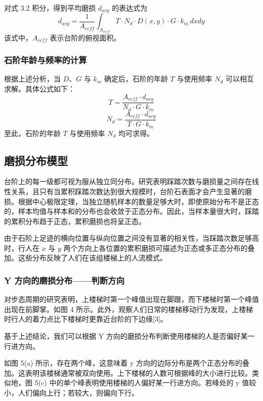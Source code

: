 \documentclass[11pt,a4paper]{ctexart}
\begin{document}
对式 3.2 积分，得到平均磨损 \(d_{avg}\) 的表达式为
\begin{equation}
d_{avg}=\frac{1}{A_{ceff}}\int_{A_{ceff}}T\cdot N_d\cdot D(x,y)\cdot G\cdot k_m\,dxdy \tag{3.8}
\end{equation}
该式中，\(A_{ceff}\) 表示台阶的俯视面积。

\subsubsection{石阶年龄与频率的计算}

根据上述分析，当 \(D\)、\(G\) 与 \(k_m\) 确定后，石阶的年龄 \(T\) 与使用频率 \(N_d\) 可以相互求解。具体公式如下：
\begin{equation}
T=\frac{A_{ceff}\cdot d_{avg}}{N_d\cdot G\cdot k_m} \tag{3.9}
\end{equation}
\begin{equation}
N_d=\frac{A_{ceff}\cdot d_{avg}}{T\cdot G\cdot k_m} \tag{3.10}
\end{equation}
至此，石阶的年龄 \(T\) 与使用频率 \(N_d\) 均可求得。

\subsection{磨损分布模型}

台阶上的每一级都可视为服从独立同分布。研究表明踩踏次数与磨损量之间存在线性关系，且只有当累积踩踏次数达到很大规模时，台阶石表面才会产生显著的磨损。根据中心极限定理，当独立随机样本的数量足够大时，即使原始分布不是正态的，样本均值与样本和的分布也会收敛于正态分布。因此，当样本量很大时，踩踏的累积分布趋于正态，累积磨损也将呈正态。

由于石阶上足迹的横向位置与纵向位置之间没有显著的相关性，当踩踏次数足够高时，行人在 \(x\) 与 \(y\) 两个方向上各位置的累积磨损可描述为正态或多正态分布的叠加。这些分布反映了人们在该组楼梯上的人流模式。

\subsubsection{Y 方向的磨损分布——判断方向}

对步态周期的研究表明，上楼梯时第一个峰值出现在脚跟，而下楼梯时第一个峰值出现在前脚掌。如图 4 所示。此外，观察人们日常的楼梯移动行为发现，上楼梯时行人的着力点比下楼梯时更靠近台阶的下边缘[3]。

基于上述结论，我们可以根据 Y 方向的磨损分布判断使用楼梯的人是否偏好某一行进方向。

如图 5(a) 所示，存在两个峰，这意味着 y 方向的边际分布是两个正态分布的叠加。这表明该楼梯通常被双向使用。上下楼梯的人数可根据峰的大小进行比较。类似地，图 5(c) 中的单个峰表明使用楼梯的人偏好某一行进方向。若峰处的 y 值较小，人们偏向上行；若较大，则偏向下行。
\end{document}

